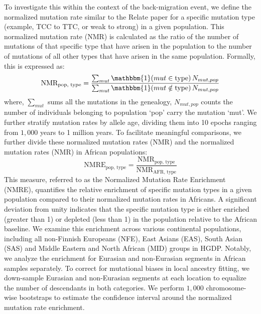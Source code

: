 To investigate this within the context of the back-migration event, we define the normalized mutation rate similar to the Relate \cite{speidel2019method} paper for a specific mutation type (example, TCC to TTC, or weak to strong) in a given population. This normalized mutation rate (NMR) is calculated as the ratio of the number of mutations of that specific type that have arisen in the population to the number of mutations of all other types that have arisen in the same population. Formally, this is expressed as:
\begin{equation}
    \text{NMR}_{\text{pop, type}} = \frac{\sum_{mut} \mathbbm{1}(mut \in \text{type}) \, N_{mut, pop}}{\sum_{mut} \mathbbm{1}(mut \notin \text{type}) \, N_{mut, pop}}
\end{equation}
where, $\sum_{mut}$ sums all the mutations in the genealogy, $N_{mut, pop}$ counts the number of individuals belonging to population `pop' carry the mutation `mut'. We further stratify mutation rates by allele age, dividing them into 10 epochs ranging from $1{,}000$ years to 1 million years. To facilitate meaningful comparisons, we further divide these normalized mutation rates (NMR) and the normalized mutation rates (NMR) in African populations:
\begin{equation}
    \text{NMRE}_{\text{pop, type}} = \frac{\text{NMR}_{\text{pop, type}}}{\text{NMR}_{\text{AFR, type}}}
\end{equation}
This measure, referred to as the Normalized Mutation Rate Enrichment (NMRE), quantifies the relative enrichment of specific mutation types in a given population compared to their normalized mutation rates in Africans. A significant deviation from unity indicates that the specific mutation type is either enriched (greater than 1) or depleted (less than 1) in the population relative to the African baseline. We examine this enrichment across various continental populations, including all non-Finnish Europeans (NFE), East Asians (EAS), South Asian (SAS) and Middle Eastern and North African (MID) groups in HGDP. Notably, we analyze the enrichment for Eurasian and non-Eurasian segments in African samples separately. To correct for mutational biases in local ancestry fitting, we down-sample Eurasian and non-Eurasian segments at each location to equalize the number of descendants in both categories. We perform $1{,}000$ chromosome-wise bootstraps to estimate the confidence interval around the normalized mutation rate enrichment. 

